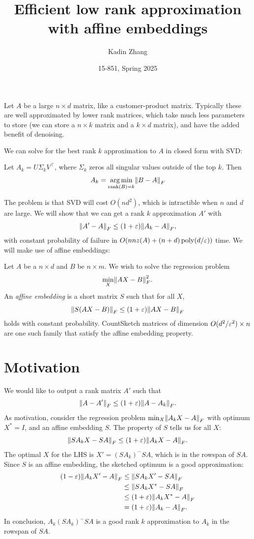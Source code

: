\documentclass{article}
\title{Efficient low rank approximation with affine embeddings}
\author{Kadin Zhang}
\date{15-851, Spring 2025}
\begin{document}
\maketitle
{
\small
\setlength{\parindent}{0em}
\setlength{\parskip}{1em}
}

Let $A$ be a large $n\times d$ matrix, like a customer-product matrix. Typically these are well approximated by lower rank matrices, which take much less parameters to store (we can store a $n\times k$ matrix and a $k\times d$ matrix), and have the added benefit of denoising.

We can solve for the best rank $k$ approximation to $A$ in closed form with SVD: 
\begin{thm}
    Let $A_k = U \Sigma _k V^{\top}  $, where $\Sigma_k  $ zeros all singular values outside of the top $k$. Then 
    \[
        A_k  = \argmin_{\rank (B) = k} \norm*{B - A}_{F}  
    \]
\end{thm}
The problem is that SVD will cost $O(nd^2 )$, which is intractible when $n$ and $d$ are large. We will show that we can get a rank $k$ approximation $A'$ with 
\[
    \norm*{A' - A}_{F} \leq (1+\eps )\norm*{A_k -A}_{F} ,
\]
with constant probability of failure in $O(nnz(A) + (n+d)\operatorname{poly}(d/\varepsilon ))$ time. We will make use of affine embeddings: 
\begin{defi}
    Let $A$ be a $n\times d$ and $B$ be $n \times m$. We wish to solve the regression problem
    \[
        \min _X \norm*{AX-B}_{F} ^2 . 
    \]
    An \emph{affine embedding} is a short matrix $S$ such that for all $X$, 
    \[
        \norm*{S(AX-B)}_{F} \leq (1+\eps )\norm*{AX-B}_{F}
    \]
    holds with constant probability. CountSketch matrices of dimension $O(d^2 /\varepsilon ^2 ) \times n $ are one such family that satisfy the affine embedding property.
\end{defi}

\section{Motivation}
We would like to output a rank matrix $A'$ such that 
\[
    \norm*{A - A'}_{F} \leq (1+\eps ) \norm*{A- A_k }_{F} .
\]
As motivation, consider the regression problem $\min _X \norm*{A_k X-A}_{F} $ with optimum $X^* = I$, and an affine embedding $S$. The property of $S$ tells us for all $X$:
\[
    \norm*{SA_k X- SA}_{F} \leq (1+\eps ) \norm*{A_k X- A}_{F}.
\]
The optimal $X$ for the LHS is $X' = (SA_k )^- SA$, which is in the rowspan of $SA$. Since $S$ is an affine embedding, the sketched optimum is a good approximation:
\begin{align*}
    (1-\eps )\norm*{A_k X' - A}_F  &\leq \norm*{SA_k X' - SA}_{F} \\
    &\leq  \norm*{SA_k X^* - SA}_{F}\\
     &\leq (1+\eps ) \norm*{A_k X^*  - A}_{F} \\
     &= (1+\eps ) \norm*{A_k -A}_{F} . 
\end{align*}
In conclusion, $A_k (SA_k )^- SA$ is a good rank $k$ approximation to $A_k $ in the rowspan of $SA$. 
\end{document}
